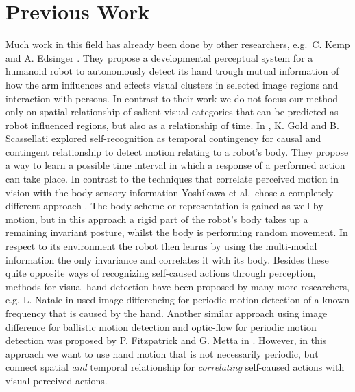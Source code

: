 \section{Previous Work}\label{prev-work}

Much work in this field has already been done by other researchers, e.g.\ C. Kemp and A. Edsinger \cite{WCIC06new}. They propose a developmental perceptual system for a humanoid robot to autonomously detect its hand trough mutual information of how the arm influences and effects visual clusters in selected image regions and interaction with persons. In contrast to their work we do not focus our method only on spatial relationship of salient visual categories that can be predicted as robot influenced regions, but also as a relationship of time. In \cite{LAWC06}, K. Gold and B. Scassellati explored self-recognition as temporal contingency for causal and contingent relationship to detect motion relating to a robot's body. They propose a way to learn a possible time interval in which a response of a performed action can take place. In contrast to the techniques that correlate perceived motion in vision with the body-sensory information Yoshikawa et al.\ chose a completely different approach \cite{DIMMRBS03-03}. The body scheme or representation is gained as well by motion, but in this approach a rigid part of the robot's body takes up a remaining invariant posture, whilst the body is performing random movement. In respect to its environment the robot then learns by using the multi-modal information the only invariance and correlates it with its body.
Besides these quite opposite ways of recognizing self-caused actions through perception, methods for visual hand detection have been proposed by many more researchers, e.g. L. Natale in \cite{HRDAG04} used image differencing for periodic motion detection of a known frequency that is caused by the hand. Another similar approach using image difference for ballistic motion detection and optic-flow for periodic motion detection was proposed by P. Fitzpatrick and G. Metta in \cite{LAOTA03}. However, in this approach we want to use hand motion that is not necessarily periodic, but connect spatial \textit{and} temporal relationship for \textit{correlating} self-caused actions with visual perceived actions.\newline
